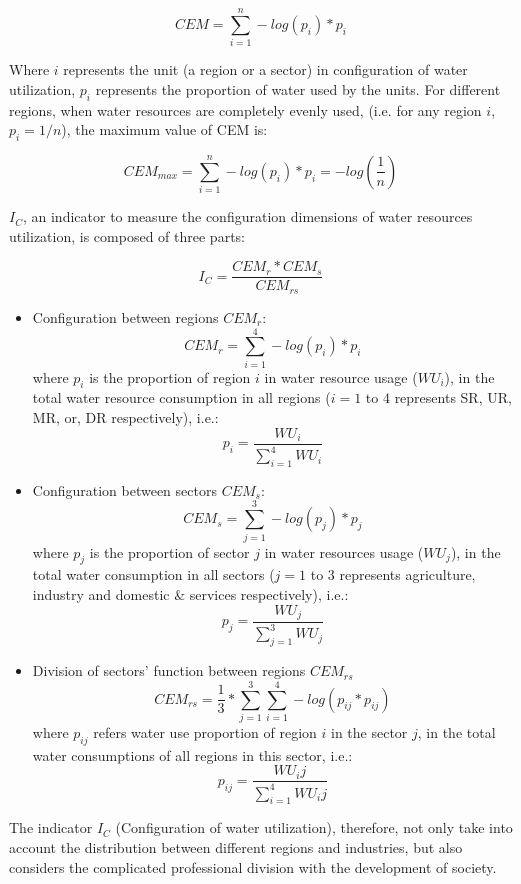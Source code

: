 \documentclass[9pt,twoside,lineno]{pnas-new}
\begin{document}
    $$ CEM = \sum_{i=1}^n -log(p_{i}) * p_{i} $$

    Where $i$ represents the unit (a region or a sector) in configuration of water utilization, $p_i$ represents the proportion of water used by the units.
    For different regions, when water resources are completely evenly used, (i.e. for any region $i$, $p_i = 1/n $), the maximum value of CEM is:

    $$ CEM_{max} = \sum_{i=1}^n -log(p_{i}) * p_{i} = - log(\frac{1}{n}) $$

    $I_C$, an indicator to measure the configuration dimensions of water resources utilization, is composed of three parts:

    $$ I_C = \frac{CEM_{r}*CEM_{s}}{CEM_{rs}}$$
    
    \begin{itemize}
        \item Configuration between regions $CEM_r$:
            $$ CEM_r = \sum_{i=1}^4 -log(p_{i}) * p_{i} $$
            where $p_i$ is the proportion of region $i$ in water resource usage ($WU_i$), in the total water resource consumption in all regions ($i=1$ to $4$ represents SR, UR, MR, or, DR respectively), i.e.:
            $$ p_i = \frac{WU_i}{\sum_{i=1}^4 WU_i} $$
        \item Configuration between sectors $CEM_s$:
            $$ CEM_s = \sum_{j=1}^3 -log(p_{j}) * p_{j} $$ 
            where $p_j$ is the proportion of sector $j$ in water resources usage ($WU_j$), in the total water consumption in all sectors ($j=1$ to $3$ represents agriculture, industry and domestic \& services respectively), i.e.:
            $$ p_j = \frac{WU_j}{\sum_{j=1}^3 WU_j} $$
        \item Division of sectors' function between regions $CEM_{rs}$
            $$ CEM_{rs} = \frac{1}{3} * \sum_{j=1}^3 \sum_{i=1}^4 -log(p_{ij} * p_{ij})$$
            where $p_{ij}$ refers water use proportion of region $i$ in the sector $j$, in the total water consumptions of all regions in this sector, i.e.: 
            $$ p_{ij} = \frac{WU_ij}{\sum_{i=1}^4 WU_ij} $$
    \end{itemize}

    The indicator $I_C$ (Configuration of water utilization), therefore, not only take into account the distribution between different regions and industries, but also considers the complicated professional division with the development of society. 
\end{document}
